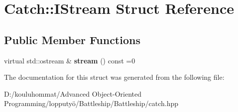 \hypertarget{struct_catch_1_1_i_stream}{}\section{Catch\+:\+:I\+Stream Struct Reference}
\label{struct_catch_1_1_i_stream}
\subsection*{Public Member Functions}
\begin{DoxyCompactItemize}
\item 
\mbox{\label{struct_catch_1_1_i_stream_a55a9ddbe250261ff38642f480ebdd902}} 
virtual std\+::ostream \& {\bfseries stream} () const =0
\end{DoxyCompactItemize}


The documentation for this struct was generated from the following file\+:\begin{DoxyCompactItemize}
\item 
D\+:/kouluhommat/\+Advanced Object-\/\+Oriented Programming/lopputyö/\+Battleship/\+Battleship/catch.\+hpp\end{DoxyCompactItemize}
